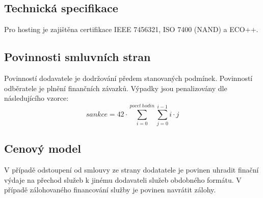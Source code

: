 \documentclass[11pt, a4paper, titlepage]{article}
\begin{document}
	\subsection*{Technická specifikace}

	Pro hosting je zajištěna certifikace IEEE 7456321, ISO 7400 (NAND) a ECO++.

	\subsection*{Povinnosti smluvních stran}

	Povinností dodavatele je dodržování předem stanovaných podmínek. Povinností odběratele je plnění finančních závazků.
	Výpadky jsou penalizovány dle následujícího vzorce:
	\[
		sankce = 42 \cdot \sum_{i = 0}^{pocet\,hodin} \sum_{j = 0}^{i - 1} i \cdot j
	\]

	\subsection*{Cenový model}
	V případě odstoupení od smlouvy ze strany dodatatele je povinen uhradit finační výdaje na přechod služeb k jinému dodavateli služeb obdobného formátu. V případě zálohovaného financování služby je povinen navrátit zálohy.

	
\end{document}
